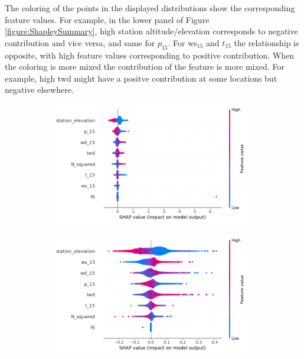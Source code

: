 The coloring of the points in the displayed distributions show the corresponding feature values. For example, in the lower panel of Figure \ref{figure:ShapleySummary}, high station altitude/elevation corresponds to negative contribution and vice versa, and same for $p_{15}$. For ws$_{15}$ and $t_{15}$ the relationship is opposite, with high feature values corresponding to positive contribution. When the coloring is more mixed the contribution of the feature is more mixed. For example, high twd might have a positve contribution at some locations but negative elsewhere.

\begin{figure}
  \centering
  \begin{subfigure}{0.9\textwidth}
    \includegraphics[width=\textwidth]{Figures/shap_plots/summary_plot.png}
  \end{subfigure}
  \vspace{0.5cm}
  \begin{subfigure}{0.9\textwidth}
    \includegraphics[width=\textwidth]{Figures/shap_plots/summary_plot_190924_.png}

\end{subfigure}
\end{figure}
